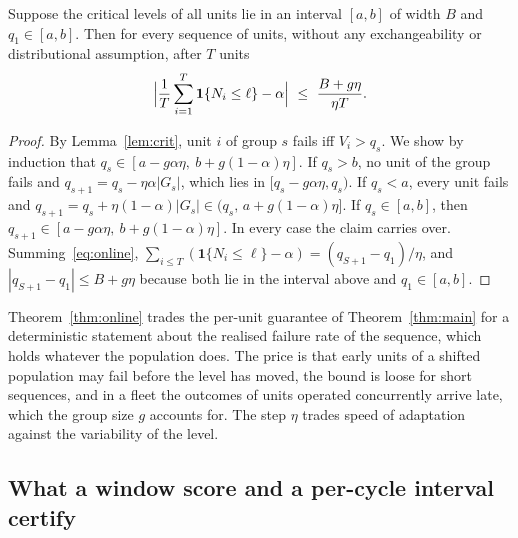 \begin{theorem}\label{thm:online}
Suppose the critical levels of all units lie in an interval $[a,b]$ of width $B$ and $q_1\in[a,b]$. Then for every sequence of units, without any exchangeability or distributional assumption, after $T$ units
\[
\Bigl|\frac1T\sum_{i=1}^{T}\mathbf 1\{N_i\le\ell\}-\alpha\Bigr|\ \le\ \frac{B+g\eta}{\eta T}.
\]
\end{theorem}
\begin{proof}
By Lemma~\ref{lem:crit}, unit $i$ of group $s$ fails iff $V_i>q_s$. We show by induction that $q_s\in[a-g\alpha\eta,\ b+g(1-\alpha)\eta]$. If $q_s>b$, no unit of the group fails and $q_{s+1}=q_s-\eta\alpha|G_s|$, which lies in $[q_s-g\alpha\eta,q_s)$. If $q_s<a$, every unit fails and $q_{s+1}=q_s+\eta(1-\alpha)|G_s|\in(q_s,\,a+g(1-\alpha)\eta]$. If $q_s\in[a,b]$, then $q_{s+1}\in[a-g\alpha\eta,\ b+g(1-\alpha)\eta]$. In every case the claim carries over. Summing~\eqref{eq:online}, $\sum_{i\le T}(\mathbf 1\{N_i\le\ell\}-\alpha)=(q_{S+1}-q_1)/\eta$, and $|q_{S+1}-q_1|\le B+g\eta$ because both lie in the interval above and $q_1\in[a,b]$.
\end{proof}

Theorem~\ref{thm:online} trades the per-unit guarantee of Theorem~\ref{thm:main} for a deterministic statement about the realised failure rate of the sequence, which holds whatever the population does. The price is that early units of a shifted population may fail before the level has moved, the bound is loose for short sequences, and in a fleet the outcomes of units operated concurrently arrive late, which the group size $g$ accounts for. The step $\eta$ trades speed of adaptation against the variability of the level.

\subsection{What a window score and a per-cycle interval certify}

